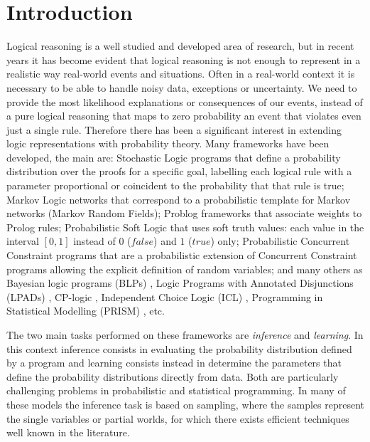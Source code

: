 \documentclass[letterpaper]{article}
\theoremstyle{plain}
\theoremstyle{definition}
\theoremstyle{remark}
\theoremstyle{definition}
\begin{document}
\section{Introduction}
Logical reasoning is a well studied and developed area of research, but in recent years it has become evident that logical reasoning is not enough to represent in a realistic way real-world events and situations. Often in a real-world context it is necessary to be able to handle noisy data, exceptions or uncertainty. We need to provide the most likelihood explanations or consequences of our events, instead of a pure logical reasoning that maps to zero probability an event that violates even just a single rule.
Therefore there has been a significant interest in extending logic representations with probability theory. 
Many frameworks have been developed, the main are:
Stochastic Logic programs \cite{SLPmuggleton96,SLPcussens2000} that define a probability distribution over the proofs for a specific goal, labelling each logical rule with a parameter proportional or coincident to the probability that that rule is true;
Markov Logic networks  \cite{markovLogicNetworks} that correspond to a probabilistic template for Markov networks (Markov Random Fields);
Problog frameworks \cite{ProbLog_original} that associate weights to Prolog rules;
Probabilistic Soft Logic  \cite{ProbSoftLogic} that uses soft truth values: each value in the interval $[0, 1] $ instead of $0$ ($false$) and $1$ ($true$) only;
Probabilistic Concurrent Constraint programs \cite{PCC} that are a probabilistic extension of Concurrent Constraint programs allowing the explicit definition of random variables;
and many others as 
Bayesian logic programs (BLPs)  \cite{LogicBN,LogicBN_1},
Logic Programs with Annotated Disjunctions (LPADs) \cite{annotatedDisjunctions}, 
CP-logic \cite{CP-logic}, 
Independent Choice Logic (ICL) \cite{IndipendentChoiceLogic93,IndipendentChoiceLogic97}, 
Programming in Statistical Modelling (PRISM) \cite{PRISM95,PRISM2001},  
etc.

The two main tasks performed on these frameworks are \emph{inference} and \emph{learning}. In this context inference consists in evaluating the probability distribution defined by a program and learning consists instead in determine the parameters that define the probability distributions directly from data. Both are particularly challenging problems in probabilistic and statistical programming.
In many of these models the inference task is based on sampling, where the samples represent the single variables or partial worlds, for which there exists efficient techniques well known in the literature.
\end{document}
